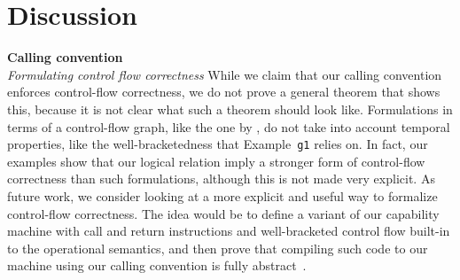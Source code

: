 \documentclass[format=acmsmall, review=true, screen=true]{acmart}
\newcommand{\itoplassug}[1]{}
\begin{document}
\section{Discussion}
\label{sec:discussion}
\itoplassug{Reviewer C, esop, would have liked a discussion of (a) what could be done on a machine with a smaller set of capabilities, e.g., no local capability (we could probably not have done anything as the stack pointer could be stored on the heap and reused at unintended times.) and (b) what could be done with a larger/stronger set of available capabilities (we could include a discussion of linear capabilities).}
\itoplassug{Reviewer C, esop, asks whether our attacker model is reasonable (see tex comment). Maybe we should include a short discussion of the attacker model.}
\itoplassug{Should we include a discussion of how this ``scales'' to other things like a multi-core setting or if we needed tail calls?}
\noindent\textbf{Calling convention}\\
\emph{Formulating control flow correctness} While we claim that our calling
convention enforces control-flow correctness, we do not prove a general theorem
that shows this, because it is not clear what such a theorem should look like.
Formulations in terms of a control-flow graph, like the one by \citet{abadi_control-flow_2005}, do not take into account temporal properties,
like the well-bracketedness that Example~\texttt{g1} relies on.
In fact, our examples show that our logical relation imply a stronger form of
control-flow correctness than such formulations, although this is not made very
explicit. As future work, we consider looking at a more explicit and useful way
to formalize control-flow correctness. The idea would be to define a variant
of our capability machine with call and return instructions and
well-bracketed control flow built-in to the operational semantics, and then
prove that compiling such code to our machine using our calling convention is
fully abstract~\citep{abadi_protection_1998}.
\itoplassug{Maybe elaborate on why full-abstractness and not weaker properties like ``robust safety''.}
\end{document}
